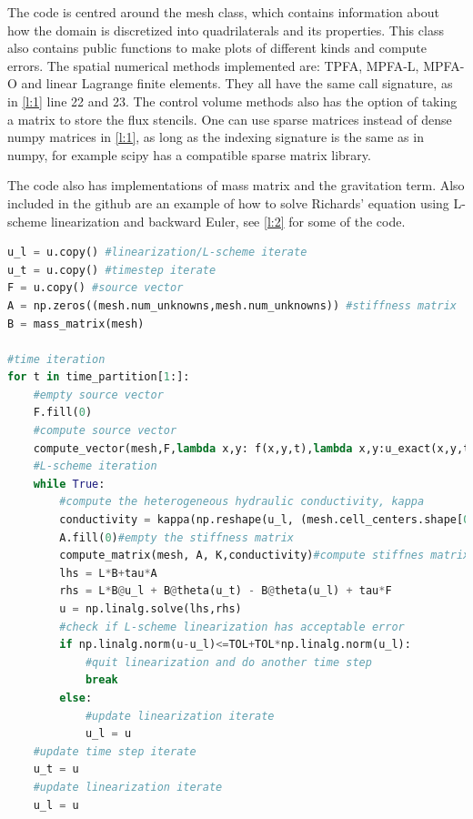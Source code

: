 \documentclass[../Main/main.tex]{subfiles}
\begin{document}
		The code is centred around the mesh class, which contains information about how the domain is discretized into quadrilaterals and its properties. This class also contains public functions to make plots of different kinds and compute errors. The spatial numerical methods implemented are: TPFA, MPFA-L, MPFA-O and linear Lagrange finite elements. They all have the same call signature, as in \ref{l:1} line 22 and 23. The control volume methods also has the option of taking a matrix to store the flux stencils. One can use sparse matrices instead of dense numpy matrices in \ref{l:1}, as long as the indexing signature is the same as in numpy, for example scipy has a compatible sparse matrix library.
		\par
		The code also has implementations of mass matrix and the gravitation term. Also included in the github are an example of how to solve Richards' equation using L-scheme linearization and backward Euler, see \ref{l:2} for some of the code.
		\begin{minipage}{1.1\linewidth}
			\centering
\begin{lstlisting}[language=Python,caption=Linearization and time stepping of Richards' equation.,label=l:2]
u_l = u.copy() #linearization/L-scheme iterate
u_t = u.copy() #timestep iterate
F = u.copy() #source vector
A = np.zeros((mesh.num_unknowns,mesh.num_unknowns)) #stiffness matrix
B = mass_matrix(mesh)

#time iteration
for t in time_partition[1:]:
	#empty source vector
	F.fill(0)
	#compute source vector
	compute_vector(mesh,F,lambda x,y: f(x,y,t),lambda x,y:u_exact(x,y,t))
	#L-scheme iteration
	while True:
		#compute the heterogeneous hydraulic conductivity, kappa
		conductivity = kappa(np.reshape(u_l, (mesh.cell_centers.shape[0],mesh.cell_centers.shape[1]),order='F'))
		A.fill(0)#empty the stiffness matrix
		compute_matrix(mesh, A, K,conductivity)#compute stiffnes matrix
		lhs = L*B+tau*A
		rhs = L*B@u_l + B@theta(u_t) - B@theta(u_l) + tau*F
		u = np.linalg.solve(lhs,rhs)
		#check if L-scheme linearization has acceptable error
		if np.linalg.norm(u-u_l)<=TOL+TOL*np.linalg.norm(u_l):
			#quit linearization and do another time step
			break
		else:
			#update linearization iterate
			u_l = u
	#update time step iterate		
	u_t = u
	#update linearization iterate
	u_l = u
\end{lstlisting}		\end{minipage}
		
		\
\end{document}
